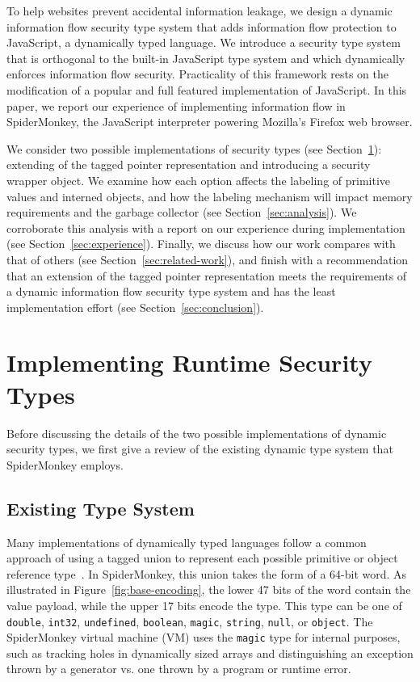 \documentclass[11pt,onecolumn]{article}
\begin{document}
To help websites prevent accidental information leakage, we design a dynamic information flow security type system that adds information flow protection to JavaScript, a dynamically typed language.
We introduce a security type system that is orthogonal to the built-in JavaScript type system and which dynamically enforces information flow security.
Practicality of this framework rests on the modification of a popular and full featured implementation of JavaScript.
In this paper, we report our experience of implementing information flow in SpiderMonkey, the JavaScript interpreter powering Mozilla's Firefox web browser.

We consider two possible implementations of security types (see Section~\ref{sec:implementation}): extending of the tagged pointer representation and introducing a security wrapper object.
We examine how each option affects the labeling of primitive values and interned objects, and how the labeling mechanism will impact memory requirements and the garbage collector (see Section~\ref{sec:analysis}).
We corroborate this analysis with a report on our experience during implementation (see Section~\ref{sec:experience}).
Finally, we discuss how our work compares with that of others (see Section~\ref{sec:related-work}), and finish with a recommendation that an extension of the tagged pointer representation meets the requirements of a dynamic information flow security type system and has the least implementation effort (see Section~\ref{sec:conclusion}).

\section{Implementing Runtime Security Types}\label{sec:implementation}

Before discussing the details of the two possible implementations of dynamic security types, we first give a review of the existing dynamic type system that SpiderMonkey employs.

\subsection{Existing Type System}

Many implementations of dynamically typed languages follow a common approach of using a tagged union to represent each possible primitive or object reference type~\cite{gudeman1993representing}.
In SpiderMonkey, this union takes the form of a 64-bit word.
As illustrated in Figure~\ref{fig:base-encoding}, the lower 47 bits of the word contain the value payload, while the upper 17 bits encode the type.
This type can be one of \texttt{double}, \texttt{int32}, \texttt{undefined}, \texttt{boolean}, \texttt{magic}, \texttt{string}, \texttt{null}, or \texttt{object}.
The SpiderMonkey virtual machine (VM) uses the \texttt{magic} type for internal purposes, such as tracking holes in dynamically sized arrays and distinguishing an exception thrown by a generator vs. one thrown by a program or runtime error.
\end{document}
